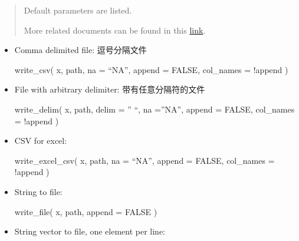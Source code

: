 \documentclass[
]{article}
\newenvironment{Shaded}{}{}
\newcommand{\AttributeTok}[1]{\textcolor[rgb]{0.49,0.56,0.16}{#1}}
\newcommand{\ConstantTok}[1]{\textcolor[rgb]{0.53,0.00,0.00}{#1}}
\newcommand{\FunctionTok}[1]{\textcolor[rgb]{0.02,0.16,0.49}{#1}}
\newcommand{\NormalTok}[1]{#1}
\newcommand{\SpecialCharTok}[1]{\textcolor[rgb]{0.25,0.44,0.63}{#1}}
\begin{document}
\begin{quote}
Default parameters are listed.

More related documents can be found in this
\href{https://r4ds.had.co.nz/data-import.html?q=file\#writing-to-a-file}{link}.
\end{quote}

\begin{itemize}
\item
  Comma delimited file: 逗号分隔文件

\begin{Shaded}
\begin{Highlighting}[]
\FunctionTok{write\_csv}\NormalTok{(}
\NormalTok{  x, }
\NormalTok{  path, }
  \AttributeTok{na =}\NormalTok{ “NA”, }
  \AttributeTok{append =} \ConstantTok{FALSE}\NormalTok{, }
  \AttributeTok{col\_names =} \SpecialCharTok{!}\NormalTok{append}
\NormalTok{) }
\end{Highlighting}
\end{Shaded}
\item
  File with arbitrary delimiter: 带有任意分隔符的文件

\begin{Shaded}
\begin{Highlighting}[]
\FunctionTok{write\_delim}\NormalTok{(}
\NormalTok{  x, }
\NormalTok{  path, }
  \AttributeTok{delim =}\NormalTok{ ” “, }
  \AttributeTok{na =}\NormalTok{”NA”, }
  \AttributeTok{append =} \ConstantTok{FALSE}\NormalTok{, }
  \AttributeTok{col\_names =} \SpecialCharTok{!}\NormalTok{append}
\NormalTok{)}
\end{Highlighting}
\end{Shaded}
\item
  CSV for excel:

\begin{Shaded}
\begin{Highlighting}[]
\FunctionTok{write\_excel\_csv}\NormalTok{(}
\NormalTok{  x, }
\NormalTok{  path, }
  \AttributeTok{na =}\NormalTok{ “NA”, }
  \AttributeTok{append =} \ConstantTok{FALSE}\NormalTok{,}
  \AttributeTok{col\_names =} \SpecialCharTok{!}\NormalTok{append}
\NormalTok{) }
\end{Highlighting}
\end{Shaded}
\item
  String to file:

\begin{Shaded}
\begin{Highlighting}[]
\FunctionTok{write\_file}\NormalTok{(}
\NormalTok{  x,}
\NormalTok{  path, }
  \AttributeTok{append =} \ConstantTok{FALSE}
\NormalTok{)}
\end{Highlighting}
\end{Shaded}
\item
  String vector to file, one element per line:


\end{itemize}
\end{document}
